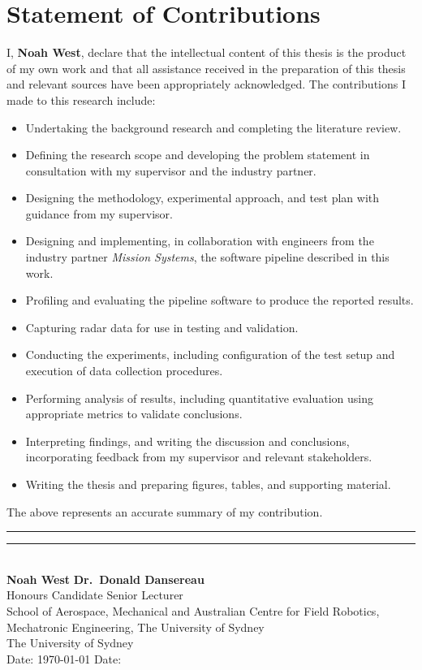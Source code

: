\section*{Statement of Contributions}

I, \textbf{Noah West}, declare that the intellectual content of this thesis is the product of my own work and that all assistance received in the preparation of this thesis and relevant sources have been appropriately acknowledged. The contributions I made to this research include:
\begin{itemize}
  \item Undertaking the background research and completing the literature review.
  \item Defining the research scope and developing the problem statement in consultation with my supervisor and the industry partner.
  \item Designing the methodology, experimental approach, and test plan with guidance from my supervisor.
  \item Designing and implementing, in collaboration with engineers from the industry partner \textit{Mission Systems}, the software pipeline described in this work.
  \item Profiling and evaluating the pipeline software to produce the reported results.
  \item Capturing radar data for use in testing and validation.
  \item Conducting the experiments, including configuration of the test setup and execution of data collection procedures.
  \item Performing analysis of results, including quantitative evaluation using appropriate metrics to validate conclusions.
  \item Interpreting findings, and writing the discussion and conclusions, incorporating feedback from my supervisor and relevant stakeholders.
  \item Writing the thesis and preparing figures, tables, and supporting material.
\end{itemize}

The above represents an accurate summary of my contribution.

\vspace{1.5em}

\noindent
\rule{0.45\textwidth}{0.4pt}\hfill
\rule{0.45\textwidth}{0.4pt}\\
\noindent
\textbf{Noah West}\hfill
\textbf{Dr.\ Donald Dansereau}\\
Honours Candidate\hfill
Senior Lecturer\\
School of Aerospace, Mechanical and\hfill
Australian Centre for Field Robotics,\\
Mechatronic Engineering,\hfill
The University of Sydney\\
The University of Sydney\hfill
\\
Date: \today \hfill
Date: \dotfill